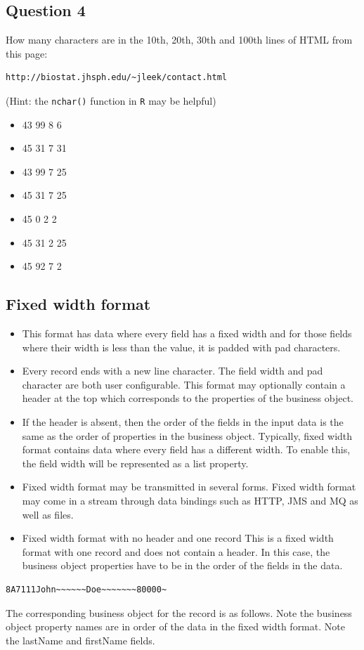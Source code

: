 \subsection*{Question 4}
How many characters are in the 10th, 20th, 30th and 100th lines of HTML from this page: 
\begin{verbatim}
http://biostat.jhsph.edu/~jleek/contact.html 
\end{verbatim}
(Hint: the \texttt{nchar()} function in \texttt{R} may be helpful)
\begin{itemize}
\item[(i)] 43 99 8 6
\item[(ii)] 45 31 7 31
\item[(iii)] 43 99 7 25
\item[(iv)] 45 31 7 25
\item[(v)] 45 0 2 2
\item[(vi)] 45 31 2 25
\item[(vii)] 45 92 7 2
\end{itemize}

\newpage
\subsection*{Fixed width format}

\begin{itemize}
\item This format has data where every field has a fixed width and for those fields where their width is less than the value, it is padded with pad characters. 
\item Every record ends with a new line character. The field width and pad character are both user configurable. This format may optionally contain a header at the top which corresponds to the properties of the business object. 

\item 
If the header is absent, then the order of the fields in the input data is the same as the order of properties in the business object. Typically, fixed width format contains data where every field has a different width. To enable this, the field width will be represented as a list property.
\item 
Fixed width format may be transmitted in several forms. Fixed width format may come in a stream through data bindings such as HTTP, JMS and MQ as well as files.
\item
Fixed width format with no header and one record
This is a fixed width format with one record and does not contain a header. In this case, the business object properties have to be in the order of the fields in the data.
\end{itemize}
\begin{framed}
\begin{verbatim}
8A7111John~~~~~~Doe~~~~~~~80000~
\end{verbatim}
\end{framed}
The corresponding business object for the record is as follows. Note the business object property names are in order of the data in the fixed width format. Note the lastName and firstName fields.

